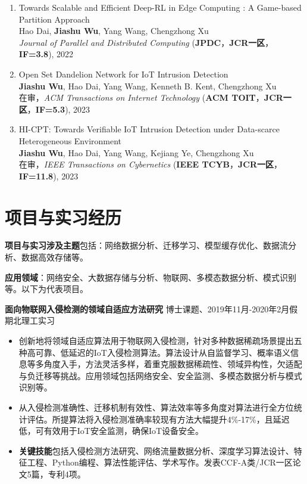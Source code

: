 \documentclass[UTF8,letterpaper,10.9pt]{article}
\begin{document}
\begin{enumerate}
  \item Towards Scalable and Efficient Deep-RL in Edge Computing : A Game-based Partition Approach\\
  Hao Dai, \textbf{Jiashu Wu}, Yang Wang\textsuperscript{\Letter}, Chengzhong Xu\\
  \textit{Journal of Parallel and Distributed Computing} (\textbf{JPDC}，\textbf{JCR一区}，\textbf{IF=3.8}), 2022

  \item Open Set Dandelion Network for IoT Intrusion Detection\\
  \textbf{Jiashu Wu}, Hao Dai, Yang Wang\textsuperscript{\Letter}, Kenneth B. Kent, Chengzhong Xu\\
  在审，\textit{ACM Transactions on Internet Technology} (\textbf{ACM TOIT}，\textbf{JCR一区}，\textbf{IF=5.3}), 2023
  
  \item HI-CPT: Towards Verifiable IoT Intrusion Detection under Data-scarce Heterogeneous Environment\\
  \textbf{Jiashu Wu}, Hao Dai, Yang Wang\textsuperscript{\Letter}, Kejiang Ye, Chengzhong Xu\\
  在审，\textit{IEEE Transactions on Cybernetics} (\textbf{IEEE TCYB}，\textbf{JCR一区}，\textbf{IF=11.8}), 2023
\end{enumerate}




\section{\textbf{项目与实习经历}}

\textbf{项目与实习涉及主题}包括：网络数据分析、迁移学习、模型缓存优化、数据流分析、数据高效存储等。

\textbf{应用领域}：网络安全、大数据存储与分析、物联网、多模态数据分析、模式识别等。以下为代表项目。

\vspace{2mm}

\textbf{面向物联网入侵检测的领域自适应方法研究} \hfill 博士课题、2019年11月-2020年2月假期北理工实习

\begin{itemize}
  \setlength\itemsep{1.8pt}
  \item 创新地将领域自适应算法用于物联网入侵检测，针对多种数据稀疏场景提出五种高可靠、低延迟的IoT入侵检测算法。算法设计从自监督学习、概率语义信息等多角度入手，方法灵活多样，着重克服数据稀疏性、领域异构性，欠适配与负迁移等挑战。应用领域包括网络安全、安全监测、多模态数据分析与模式识别等。
  \item 从入侵检测准确性、迁移机制有效性、算法效率等多角度对算法进行全方位统计评估。所提算法将入侵检测准确率较现有方法大幅提升4\%-17\%，且延迟低，可有效用于IoT安全监测，确保IoT设备安全。
  \item \textbf{关键技能}包括入侵检测方法研究、网络流量数据分析、深度学习算法设计、特征工程、Python编程、算法性能评估、学术写作。发表CCF-A类/JCR一区论文5篇，专利4项。
\end{itemize}
\end{document}
